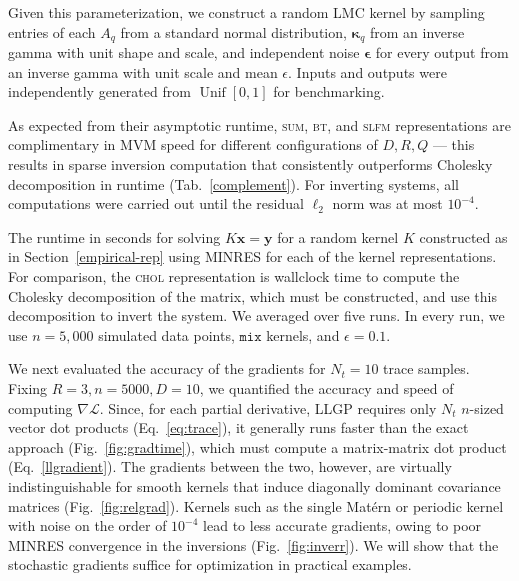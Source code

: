 \documentclass{article}
\def\bse{{\boldsymbol\epsilon}}
\def\bsk{{\boldsymbol\kappa}}
\def \mcL {\mathcal{L}}
\def\Tx{\textbf{x}}
\def\Ty{\textbf{y}}
\DeclareMathOperator\Unif{Unif}
\begin{document}
Given this parameterization, we construct a random LMC kernel by sampling entries of each $A_q$ from a standard normal distribution, $\bsk_q$ from an inverse gamma with unit shape and scale, and independent noise $\bse$ for every output from an inverse gamma with unit scale and mean $\epsilon$. Inputs and outputs were independently generated from $\Unif[0,1]$ for benchmarking.

As expected from their asymptotic runtime, \textsc{sum}, \textsc{bt}, and \textsc{slfm} representations are complimentary in MVM speed for different configurations of $D,R,Q$ --- this results in sparse inversion computation that consistently outperforms Cholesky decomposition in runtime (Tab.~\ref{complement}).
For inverting systems, all computations were carried out until the residual $\ell_2$ norm was at most $10^{-4}$.



\begin{table}[!ht]
  \caption{The runtime in seconds for solving $K\Tx=\Ty$ for a random kernel $K$ constructed as in Section~\ref{empirical-rep} using MINRES for each of the kernel representations. For comparison, the \textsc{chol} representation is wallclock time to compute the Cholesky decomposition of the matrix, which must be constructed, and use this decomposition to invert the system. We averaged over five runs. In every run, we use $n=5,000$ simulated data points, $\texttt{mix}$ kernels, and $\epsilon=0.1$.
}
\label{complement}
\vskip 0.15in
\begin{center}
  \begin{small}
    
\end{small}
\end{center}
\vskip -0.1in
\end{table}

We next evaluated the accuracy of the gradients for $N_t=10$ trace samples. Fixing $R=3,n=5000,D=10$, we quantified the accuracy and speed of computing $\nabla\mcL$. Since, for each partial derivative, LLGP requires only $N_t$ $n$-sized vector dot products (Eq.~\ref{eq:trace}), it generally runs faster than the exact approach (Fig.~\ref{fig:gradtime}), which must compute a matrix-matrix dot product (Eq.~\ref{llgradient}). The gradients between the two, however, are virtually indistinguishable for smooth kernels that induce diagonally dominant covariance matrices (Fig.~\ref{fig:relgrad}). Kernels such as the single Mat\'{e}rn or periodic kernel with noise on the order of $10^{-4}$ lead to less accurate gradients, owing to poor MINRES convergence in the inversions (Fig.~\ref{fig:inverr}). We will show that the stochastic gradients suffice for optimization in practical examples.
\end{document}
